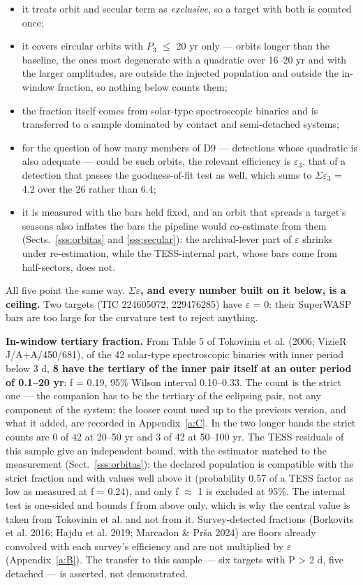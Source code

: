 \documentclass{aa}
\begin{document}
\begin{itemize}
\item it treats orbit and secular term as \textit{exclusive}, so a target with both is counted once;
\item it covers circular orbits with $P_3$ $\le$ 20 yr only --- orbits longer than the baseline, the ones most degenerate with a quadratic over 16--20 yr and with the larger amplitudes, are outside the injected population and outside the in-window fraction, so nothing below counts them;
\item the fraction itself comes from solar-type spectroscopic binaries and is transferred to a sample dominated by contact and semi-detached systems;
\item for the question of how many members of D9 --- detections whose quadratic is also adequate --- could be such orbits, the relevant efficiency is $\varepsilon_3$, that of a detection that passes the goodness-of-fit test as well, which sums to $\Sigma\varepsilon_3$ = 4.2 over the 26 rather than 6.4;
\item it is measured with the bars held fixed, and an orbit that spreads a target's seasons also inflates the bars the pipeline would co-estimate from them (Sects.~\ref{sss:orbitas} and \ref{sss:secular}): the archival-lever part of $\varepsilon$ shrinks under re-estimation, while the TESS-internal part, whose bars come from half-sectors, does not.
\end{itemize}

All five point the same way. \textbf{$\Sigma\varepsilon$, and every number built on it below, is a ceiling.} Two targets (TIC 224605072, 229476285) have $\varepsilon$ = 0: their SuperWASP bars are too large for the curvature test to reject anything.

\textbf{In-window tertiary fraction.} From Table 5 of Tokovinin et al. (2006; VizieR J/A+A/450/681), of the 42 solar-type spectroscopic binaries with inner period below 3 d, \textbf{8 have the tertiary of the inner pair itself at an outer period of 0.1--20 yr}: f = 0.19, 95\% Wilson interval 0.10--0.33. The count is the strict one --- the companion has to be the tertiary of the eclipsing pair, not any component of the system; the looser count used up to the previous version, and what it added, are recorded in Appendix~\ref{a:C}. In the two longer bands the strict counts are 0 of 42 at 20--50 yr and 3 of 42 at 50--100 yr. The TESS residuals of this sample give an independent bound, with the estimator matched to the measurement (Sect.~\ref{sss:orbitas}): the declared population is compatible with the strict fraction and with values well above it (probability 0.57 of a TESS factor as low as measured at f = 0.24), and only f $\approx$ 1 is excluded at 95\%. The internal test is one-sided and bounds f from above only, which is why the central value is taken from Tokovinin et al. and not from it. Survey-detected fractions (Borkovits et al. 2016; Hajdu et al. 2019; Marcadon \& Prša 2024) are floors already convolved with each survey's efficiency and are not multiplied by $\varepsilon$ (Appendix~\ref{a:B}). The transfer to this sample --- six targets with P > 2 d, five detached --- is asserted, not demonstrated.
\end{document}

